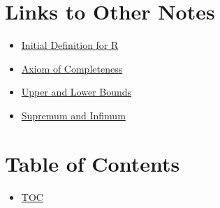 \section*{Links to Other Notes}
\begin{itemize}
  \item \hyperref[202501180703]{Initial Definition for R}
  \item \hyperref[202501180727]{Axiom of Completeness}
  \item \hyperref[202501180734]{Upper and Lower Bounds}
  \item \hyperref[202501180743]{Supremum and Infimum}
\end{itemize}

\section*{Table of Contents}

\begin{itemize}
  \item \hyperref[toc]{TOC}
\end{itemize}

